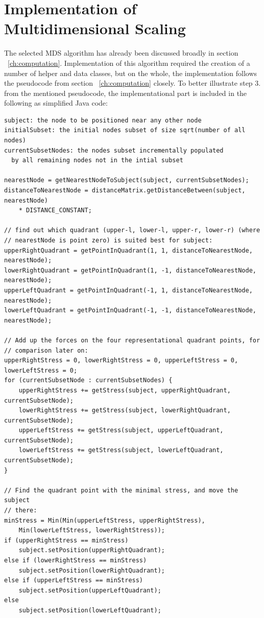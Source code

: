 \section{Implementation of Multidimensional Scaling}
\label{subch:implementation-mds}

The selected MDS algorithm has already been discussed broadly in section ~\ref{ch:computation}. Implementation of this algorithm required the creation of a number of helper and data classes, but on the whole, the implementation follows the pseudocode from section ~\ref{ch:computation} closely. To better illustrate step 3. from the mentioned pseudocode, the implementational part is included in the following as simplified Java code:

\begin{verbatim}
subject: the node to be positioned near any other node
initialSubset: the initial nodes subset of size sqrt(number of all nodes)
currentSubsetNodes: the nodes subset incrementally populated 
  by all remaining nodes not in the intial subset

nearestNode = getNearestNodeToSubject(subject, currentSubsetNodes);
distanceToNearestNode = distanceMatrix.getDistanceBetween(subject, nearestNode)
    * DISTANCE_CONSTANT;

// find out which quadrant (upper-l, lower-l, upper-r, lower-r) (where
// nearestNode is point zero) is suited best for subject:
upperRightQuadrant = getPointInQuadrant(1, 1, distanceToNearestNode, nearestNode);
lowerRightQuadrant = getPointInQuadrant(1, -1, distanceToNearestNode, nearestNode);
upperLeftQuadrant = getPointInQuadrant(-1, 1, distanceToNearestNode, nearestNode);
lowerLeftQuadrant = getPointInQuadrant(-1, -1, distanceToNearestNode, nearestNode);

// Add up the forces on the four representational quadrant points, for
// comparison later on:
upperRightStress = 0, lowerRightStress = 0, upperLeftStress = 0, lowerLeftStress = 0;
for (currentSubsetNode : currentSubsetNodes) {
    upperRightStress += getStress(subject, upperRightQuadrant, currentSubsetNode);
    lowerRightStress += getStress(subject, lowerRightQuadrant, currentSubsetNode);
    upperLeftStress += getStress(subject, upperLeftQuadrant, currentSubsetNode);
    lowerLeftStress += getStress(subject, lowerLeftQuadrant, currentSubsetNode);
}

// Find the quadrant point with the minimal stress, and move the subject
// there:
minStress = Min(Min(upperLeftStress, upperRightStress),
    Min(lowerLeftStress, lowerRightStress));
if (upperRightStress == minStress)
    subject.setPosition(upperRightQuadrant);
else if (lowerRightStress == minStress)
    subject.setPosition(lowerRightQuadrant);
else if (upperLeftStress == minStress)
    subject.setPosition(upperLeftQuadrant);
else
    subject.setPosition(lowerLeftQuadrant);


\end{verbatim}
